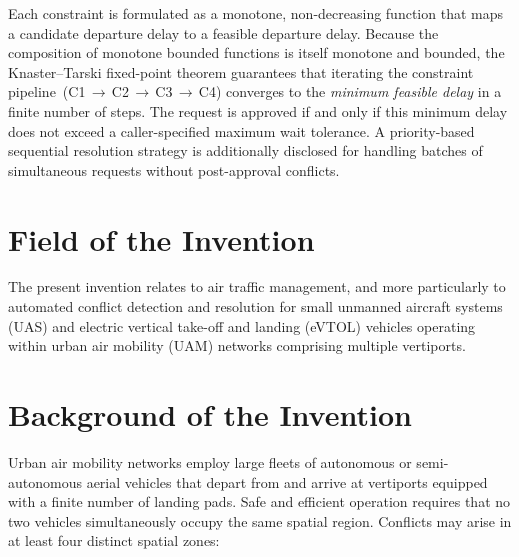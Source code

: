 \documentclass[12pt,a4paper]{article}
\begin{document}
Each constraint is formulated as a monotone, non-decreasing function that maps
a candidate departure delay to a feasible departure delay.  Because the
composition of monotone bounded functions is itself monotone and bounded, the
Knaster--Tarski fixed-point theorem guarantees that iterating the constraint
pipeline~(C1\,$\to$\,C2\,$\to$\,C3\,$\to$\,C4) converges to the
\emph{minimum feasible delay} in a finite number of steps.  The request is
approved if and only if this minimum delay does not exceed a caller-specified
maximum wait tolerance.  A priority-based sequential resolution strategy is
additionally disclosed for handling batches of simultaneous requests without
post-approval conflicts.

\section{Field of the Invention}

The present invention relates to air traffic management, and more particularly
to automated conflict detection and resolution for small unmanned aircraft
systems (UAS) and electric vertical take-off and landing (eVTOL) vehicles
operating within urban air mobility (UAM) networks comprising multiple
vertiports.

\section{Background of the Invention}

Urban air mobility networks employ large fleets of autonomous or
semi-autonomous aerial vehicles that depart from and arrive at vertiports
equipped with a finite number of landing pads.  Safe and efficient operation
requires that no two vehicles simultaneously occupy the same spatial region.
Conflicts may arise in at least four distinct spatial zones:
\end{document}
